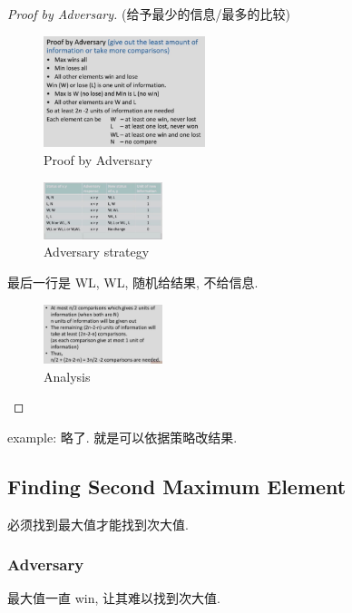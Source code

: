 \begin{proof}[Proof by Adversary] (给予最少的信息/最多的比较)
    \begin{figure}[!htb]
        \centering
        \includegraphics[width=0.42\textwidth]{pic/DAA2/Proof by Adversaryp1.png}
        \caption{Proof by Adversary}
    \end{figure}
    
    \begin{figure}[!htb]
        \centering
        \includegraphics[width=0.309\textwidth]{pic/DAA2/Adversary strategy}
        \caption{Adversary strategy}
    \end{figure}
    最后一行是 WL, WL, 随机给结果, 不给信息.

    \begin{figure}[!htb]
        \centering
        \includegraphics[width=0.309\textwidth]{pic/DAA2/Analysis}
        \caption{Analysis}
    \end{figure}
    
\end{proof}

example: 略了. 就是可以依据策略改结果. 

\subsection{Finding Second Maximum Element}
必须找到最大值才能找到次大值. 

\subsubsection{Adversary}
最大值一直 win, 让其难以找到次大值. 

